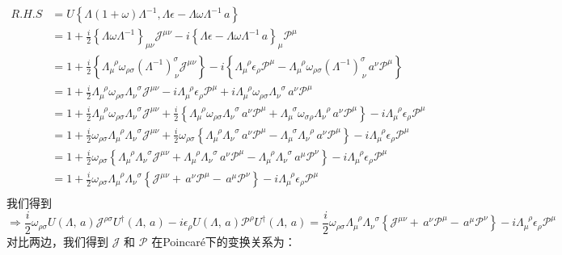 \[    \begin{aligned}
        R.H.S&={U}\left\{\Lambda(1+\omega)\Lambda^{-1},\Lambda\epsilon-\Lambda\omega\Lambda^{-1}\,a\right\}\\
        &={1} +\frac{i}{2}\left\{ \Lambda\omega\Lambda^{-1}\right\}_{\mu\nu}\mathscr{J}^{\mu\nu}-i\left\{\Lambda\epsilon-\Lambda\omega\Lambda^{-1}\,a\right\}_\mu\mathscr{P}^\mu\\
        &={1} +\frac{i}{2}\left\{ \Lambda_\mu^{\;\;\rho}\omega_{\rho\sigma}(\Lambda^{-1})^\sigma_{\,\nu}\mathscr{J}^{\mu\nu}\right\}-i\left\{\Lambda^{\;\;\rho}_\mu\epsilon_\rho\mathscr{P}^\mu-\Lambda_\mu^{\;\;\rho}\omega_{\rho\sigma}(\Lambda^{-1})^\sigma_{\,\nu}\,a^\nu \mathscr{P}^\mu\right\}\\
        &={1} +\frac{i}{2} \Lambda_\mu^{\;\;\rho}\omega_{\rho\sigma}\Lambda^{\;\;\sigma}_\nu\mathscr{J}^{\mu\nu}
        -i\Lambda^{\;\;\rho}_\mu\epsilon_\rho\mathscr{P}^\mu
        +i\Lambda_\mu^{\;\;\rho}\omega_{\rho\sigma}\Lambda^{\;\;\sigma}_\nu\,a^\nu\mathscr{P}^\mu\\
        &={1} +\frac{i}{2} \Lambda_\mu^{\;\;\rho}\omega_{\rho\sigma}\Lambda^{\;\;\sigma}_\nu\mathscr{J}^{\mu\nu}
        +\frac{i}{2}\left\{\Lambda_\mu^{\;\;\rho}\omega_{\rho\sigma}\Lambda^{\;\;\sigma}_\nu\,a^\nu\mathscr{P}^\mu+  
        \Lambda_\mu^{\;\;\sigma}\omega_{\sigma\rho}\Lambda^{\;\;\rho}_\nu\,a^\nu\mathscr{P}^\mu\right\}
        -i\Lambda^{\;\;\rho}_\mu\epsilon_\rho\mathscr{P}^\mu\\
        &={1} +\frac{i}{2}\omega_{\rho\sigma} \Lambda_\mu^{\;\;\rho}\Lambda^{\;\;\sigma}_\nu\mathscr{J}^{\mu\nu}
        +\frac{i}{2}\omega_{\rho\sigma}\left\{\Lambda_\mu^{\;\;\rho}\Lambda^{\;\;\sigma}_\nu\,a^\nu\mathscr{P}^\mu-
        \Lambda_\mu^{\;\;\sigma}\Lambda^{\;\;\rho}_\nu\,a^\nu\mathscr{P}^\mu\right\}
        -i\Lambda^{\;\;\rho}_\mu\epsilon_\rho\mathscr{P}^\mu\\
        &={1} +\frac{i}{2}\omega_{\rho\sigma} \left\{
        \Lambda_\mu^{\;\;\rho}\Lambda^{\;\;\sigma}_\nu\mathscr{J}^{\mu\nu}+
        \Lambda_\mu^{\;\;\rho}\Lambda^{\;\;\sigma}_\nu\,a^\nu\mathscr{P}^\mu-
        \Lambda_\mu^{\;\;\rho}\Lambda^{\;\;\sigma}_\nu\,a^\mu\mathscr{P}^\nu\right\}
        -i\Lambda^{\;\;\rho}_\mu\epsilon_\rho\mathscr{P}^\mu\\
        &={1} +\frac{i}{2}\omega_{\rho\sigma} \Lambda_\mu^{\;\;\rho}\Lambda^{\;\;\sigma}_\nu\left\{
        \mathscr{J}^{\mu\nu}+
        \,a^\nu\mathscr{P}^\mu-
        \,a^\mu\mathscr{P}^\nu\right\}
        -i\Lambda^{\;\;\rho}_\mu\epsilon_\rho\mathscr{P}^\mu\\
    \end{aligned}\]
我们得到
\[\Rightarrow \frac{i}{2}\omega_{\rho\sigma}{U}(\Lambda,\,a)\mathscr{J}^{\rho\sigma}{U}^\dagger(\Lambda,\,a)
    -i\epsilon_\rho{U}(\Lambda,\,a)\mathscr{P}^\rho{U}^\dagger(\Lambda,\,a)=
    \frac{i}{2}\omega_{\rho\sigma} \Lambda_\mu^{\;\;\rho}\Lambda^{\;\;\sigma}_\nu\left\{
    \mathscr{J}^{\mu\nu}+
    \,a^\nu\mathscr{P}^\mu-
    \,a^\mu\mathscr{P}^\nu\right\}
    -i\Lambda^{\;\;\rho}_\mu\epsilon_\rho\mathscr{P}^\mu
    \]
对比两边，我们得到 \(\mathscr{J}\) 和 \(\mathscr{P}\) 在Poincar\'e下的变换关系为：

